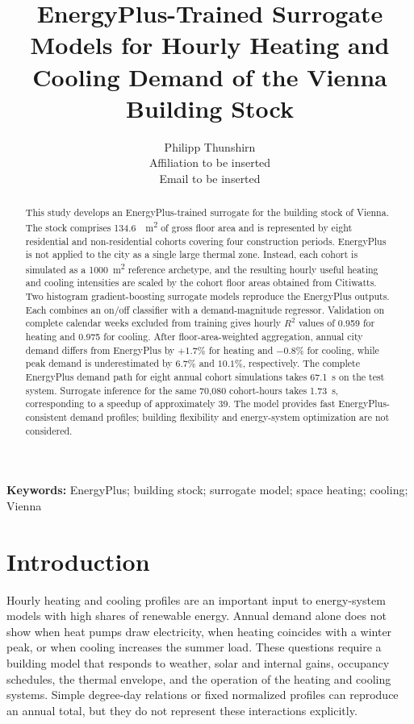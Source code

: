 \documentclass[10pt,twocolumn]{article}
\title{EnergyPlus-Trained Surrogate Models for Hourly Heating and Cooling Demand of the Vienna Building Stock}
\author{Philipp Thunshirn\\
\small Affiliation to be inserted\\
\small Email to be inserted}
\date{}
\begin{document}
\maketitle

\begin{abstract}
This study develops an EnergyPlus-trained surrogate for the building stock of
Vienna. The stock comprises \SI{134.6}{\million\metre\squared} of gross floor
area and is represented by eight residential and non-residential cohorts
covering four construction periods. EnergyPlus is not applied to the city as a
single large thermal zone. Instead, each cohort is simulated as a
\SI{1000}{\metre\squared} reference archetype, and the resulting hourly useful
heating and cooling intensities are scaled by the cohort floor areas obtained
from Citiwatts. Two histogram gradient-boosting surrogate models reproduce the
EnergyPlus outputs. Each combines an on/off classifier with a demand-magnitude
regressor. Validation on complete calendar weeks excluded from training gives
hourly $R^2$ values of 0.959 for heating and 0.975 for cooling. After
floor-area-weighted aggregation, annual city demand differs from EnergyPlus by
$+1.7\%$ for heating and $-0.8\%$ for cooling, while peak demand is
underestimated by $6.7\%$ and $10.1\%$, respectively. The complete EnergyPlus
demand path for eight annual cohort simulations takes \SI{67.1}{\second} on the
test system. Surrogate inference for the same 70,080 cohort-hours takes
\SI{1.73}{\second}, corresponding to a speedup of approximately 39. The model
provides fast EnergyPlus-consistent demand profiles; building flexibility and
energy-system optimization are not considered.
\end{abstract}

\noindent\textbf{Keywords:} EnergyPlus; building stock; surrogate model; space
heating; cooling; Vienna

\section{Introduction}

Hourly heating and cooling profiles are an important input to energy-system
models with high shares of renewable energy. Annual demand alone does not show
when heat pumps draw electricity, when heating coincides with a winter peak, or
when cooling increases the summer load. These questions require a building
model that responds to weather, solar and internal gains, occupancy schedules,
the thermal envelope, and the operation of the heating and cooling systems.
Simple degree-day relations or fixed normalized profiles can reproduce an
annual total, but they do not represent these interactions explicitly.
\end{document}
